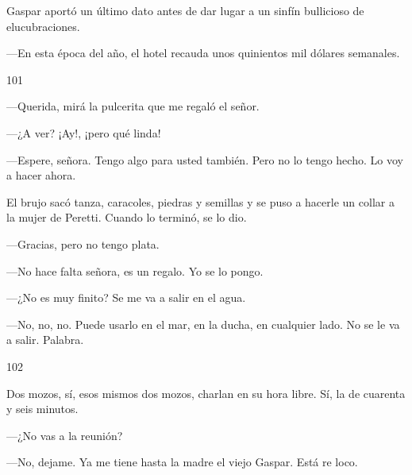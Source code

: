 \documentclass[12pt,twoside,openright,a5paper]{book}
\begin{document}
Gaspar aportó un último dato antes de dar lugar a un sinfín bullicioso
de elucubraciones. 

---En esta época del año, el hotel recauda unos quinientos mil dólares semanales.

\vspace{0.5cm}

\hrulefill \hspace{0.1cm}\decofourleft\hspace{0.2cm} 101 \hspace{0.2cm}\decofourright \hspace{0.1cm}\hrulefill

\nopagebreak

\vspace{0.5cm}

\nopagebreak

---Querida, mirá la pulcerita que me regaló el señor.

---¿A ver? ¡Ay!, ¡pero qué linda!

---Espere, señora. Tengo algo para usted también. Pero no lo tengo hecho. Lo
voy a hacer ahora.

El brujo sacó tanza, caracoles, piedras y semillas y se puso a hacerle
un collar a la mujer de Peretti. Cuando lo terminó, se lo dio.

---Gracias, pero no tengo plata.

---No hace falta señora, es un regalo. Yo se lo pongo.

---¿No es muy finito? Se me va a salir en el agua.

---No, no, no. Puede usarlo en el mar, en la ducha, en cualquier lado. No se
le va a salir. Palabra.

\vspace{0.5cm}

\hrulefill \hspace{0.1cm}\decofourleft\hspace{0.2cm} 102 \hspace{0.2cm}\decofourright \hspace{0.1cm}\hrulefill

\nopagebreak

\vspace{0.5cm}

\nopagebreak

Dos mozos, sí, esos mismos dos mozos, charlan en su hora libre. Sí, la de
cuarenta y seis minutos.

---¿No vas a la reunión?

---No, dejame. Ya me tiene hasta la madre el viejo Gaspar. Está re loco.
\end{document}
